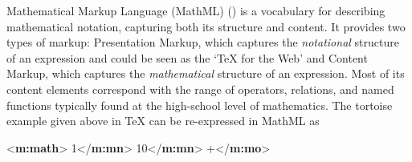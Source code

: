Mathematical Markup Language (MathML) (\cite{MATHML}) is a vocabulary for describing mathematical notation, capturing both its structure and content.  It provides two types of markup: Presentation Markup, which captures the {\itshape notational} structure of an expression and could be seen as the ‘TeX for the Web’ and Content Markup, which captures the {\itshape mathematical} structure of an expression. Most of its content elements correspond with the range of operators, relations, and named functions typically found at the high-school level of mathematics. The tortoise example given above in TeX can be re-expressed in MathML as \par\bgroup\exampleFont \begin{shaded}\noindent\mbox{}{<\textbf{m:math}>}\mbox{}\newline 
{}\mbox{}\newline 
\hspace*{1em}\mbox{}\newline 
\hspace*{1em}\hspace*{1em}1{</\textbf{m:mn}>}\mbox{}\newline 
\hspace*{1em}\mbox{}\newline 
\hspace*{1em}\mbox{}\newline 
\hspace*{1em}\hspace*{1em}10{</\textbf{m:mn}>}\mbox{}\newline 
\hspace*{1em}\mbox{}\newline 
{}\mbox{}\newline 
{}+{</\textbf{m:mo}>}\mbox{}\newline 
{}\mbox{}\newline 

\end{shaded}
